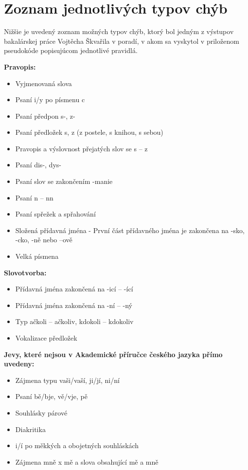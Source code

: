 \documentclass[12pt,oneside]{fithesis2}
\begin{document}
\chapter{Zoznam jednotlivých typov chýb} \label{typy-chyb}
    \par Nižšie je uvedený zoznam možných typov chýb, ktorý bol jedným z výstupov bakalárskej práce Vojtěcha Škvařila\cite{skvaril14} v poradí, v akom sa vyskytol v priloženom pseudokóde popisujúcom jednotlivé pravidlá.
	\par \bigskip \textbf{Pravopis:}
\begin{itemize}
	\item Vyjmenovaná slova
	\item Psaní i/y po písmenu c
	\item Psaní předpon s-, z-
	\item Psaní předložek s, z (z postele, s knihou, s sebou)
	\item Pravopis a výslovnost přejatých slov se s – z
	\item Psaní dis-, dys-
	\item Psaní slov se zakončením -manie
	\item Psaní n – nn
	\item Psaní spřežek a spřahování
	\item Složená přídavná jména - První část přídavného jména je zakončena na -sko, -cko, -ně nebo –ově
	\item Velká písmena
\end{itemize}
\bigskip
	\textbf{Slovotvorba:}
\begin{itemize}
	\item Přídavná jména zakončená na -icí – -ící
	\item Přídavná jména zakončená na -ní – -ný
	\item Typ ačkoli – ačkoliv, kdokoli – kdokoliv
	\item Vokalizace předložek
\end{itemize}
\bigskip
	\textbf{Jevy, které nejsou v Akademické příručce českého jazyka přímo uvedeny:}
\begin{itemize}
	\item Zájmena typu vaši/vaší, ji/jí, ni/ní
	\item Psaní bě/bje, vě/vje, pě
	\item Souhlásky párové
	\item Diakritika
	\item i/í po měkkých a obojetných souhláskách
	\item Zájmena mně x mě a slova obsahující mě a mně
\end{itemize}
\end{document}

